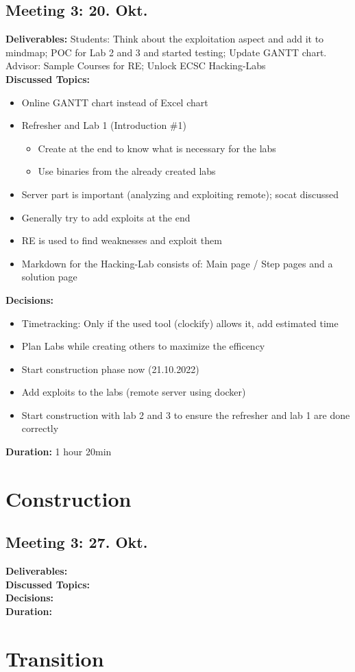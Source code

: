 \subsection*{Meeting 3: 20. Okt.}
\textbf{Deliverables:} Students: Think about the exploitation aspect and add it to mind\-map; POC for Lab 2 and 3 and started testing; Update GANTT chart. \\ 
Advisor: Sample Courses for RE; Unlock ECSC Hacking-Labs \\
\textbf{Discussed Topics:} 
\begin{itemize}
    \item Online GANTT chart instead of Excel chart
    \item Refresher and Lab 1 (Introduction \#1)
    \begin{itemize}
        \item Create at the end to know what is necessary for the labs
        \item Use binaries from the already created labs
    \end{itemize}
    \item Server part is important (analyzing and exploiting remote); socat discussed
    \item Generally try to add exploits at the end
    \item RE is used to find weaknesses and exploit them
    \item Markdown for the Hacking-Lab consists of: Main page / Step pages and a solution page
\end{itemize}
\textbf{Decisions:}
\begin{itemize}
    \item Timetracking: Only if the used tool (clockify) allows it, add estimated time
    \item Plan Labs while creating others to maximize the efficency
    \item Start construction phase now (21.10.2022)
    \item Add exploits to the labs (remote server using docker)
    \item Start construction with lab 2 and 3 to ensure the refresher and lab 1 are done correctly
\end{itemize}
\textbf{Duration:} 1 hour 20min

\section{Construction}
\subsection*{Meeting 3: 27. Okt.}
\textbf{Deliverables:} \\
\textbf{Discussed Topics:} \\
\textbf{Decisions:} \\
\textbf{Duration:}

\section{Transition}
